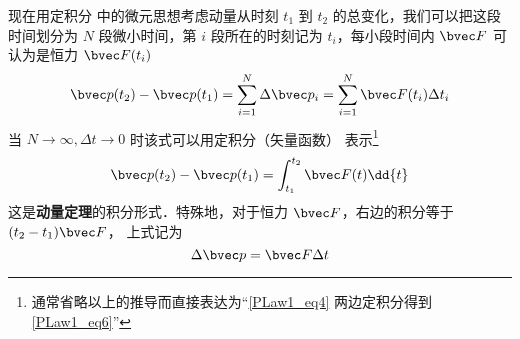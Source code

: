 现在用定积分 中的微元思想考虑动量从时刻 $t_1$ 到 $t_2$ 的总变化，我们可以把这段时间划分为 $N$ 段微小时间，第 $i$ 段所在的时刻记为 $t_i$，每小段时间内 $\bvec F$ 可认为是恒力 $\bvec F(t_i)$
\begin{equation}
\bvec p(t_2)-\bvec p(t_1) = \sum_{i=1}^{N} \Delta\bvec p_i= \sum_{i=1}^{N} \bvec F(t_i) \Delta t_i
\end{equation}
当 $N\to\infty, \Delta t\to 0$ 时该式可以用定积分（矢量函数）%
表示\footnote{通常省略以上的推导而直接表达为“\autoref{PLaw1_eq4} 两边定积分得到\autoref{PLaw1_eq6}”}
\begin{equation}\label{PLaw1_eq6}
\bvec p(t_2)-\bvec p(t_1) = \int_{t_1}^{t_2}\bvec F(t) \dd{t}
\end{equation}
这是\textbf{动量定理}的积分形式．特殊地，对于恒力 $\bvec F$，右边的积分等于 $(t_2-t_1)\bvec F$， 上式记为
\begin{equation}\label{PLaw1_eq1}
\Delta \bvec p = \bvec F \Delta t
\end{equation}
